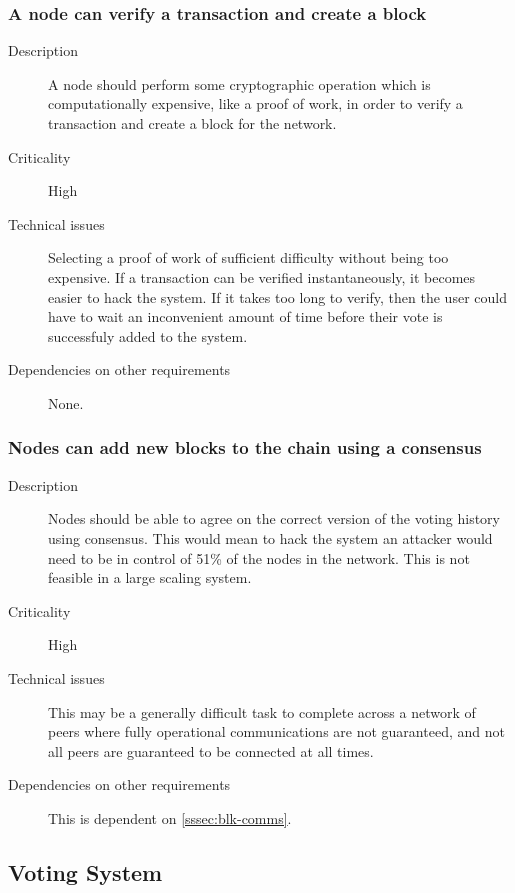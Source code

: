 \documentclass[a4paper,12pt]{article}
\begin{document}
\subsubsection{A node can verify a transaction and create a block}
\begin{description}
	\item[Description]
		A node should perform some cryptographic operation which is computationally expensive, like a proof of work, in order to verify a transaction and create a block for the network.
	\item[Criticality]
		High
	\item[Technical issues]
		Selecting a proof of work of sufficient difficulty without being too expensive. If a transaction can be verified instantaneously, it becomes easier to hack the system. If it takes too long to verify, then the user could have to wait an inconvenient amount of time before their vote is successfuly added to the system.
	\item[Dependencies on other requirements]
		None.
\end{description}

\subsubsection{Nodes can add new blocks to the chain using a consensus}
\begin{description}
	\item[Description]
		Nodes should be able to agree on the correct version of the voting history using consensus. This would mean to hack the system an attacker would need to be in control of 51\% of the nodes in the network. This is not feasible in a large scaling system.
	\item[Criticality]
		High
	\item[Technical issues]
		This may be a generally difficult task to complete across a network of peers where fully operational communications are not guaranteed, and not all peers are guaranteed to be connected at all times.
	\item[Dependencies on other requirements]
		This is dependent on \ref{sssec:blk-comms}.
\end{description}

\subsection{Voting System}
\end{document}

